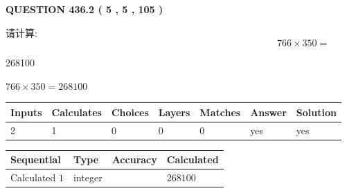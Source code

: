 \documentclass{ctexart}
\begin{document}
   
  
\vspace{0.2in}
  
{\textbf{\Large{QUESTION
436.2 
 ( 5 , 5 , 105 )
}}}
  
  
 
请计算:
\begin{equation}
766  \times    %
350 = \nonumber
\end{equation}
 
 
 
\noindent{}
 
 

268100
 
 
\noindent{}
 
 

 
 
 
\noindent{}
 
 

$ %
766 \times  %
350=   %
268100$
 
 
\noindent{}
 
 

 
   
   
   
   
\noindent\begin{tabular}{|l|l|l|l|l|l|l|}
 \hline
Inputs & Calculates & Choices & Layers & Matches & Answer & Solution \\ \hline
 2  & 
 1  & 
 0
  & 
 0  & 
 0  & 
  yes & 
  yes 
  \\ \hline
 \end{tabular}
   
   
   
   
\noindent{}
   
   
  
  
\noindent\begin{tabular}{|l|l|l|l|}
\hline
 Sequential & Type & Accuracy & Calculated \\ 
\hline
 
 
  Calculated $  1 $ & integer &  & 
  $ 268100 $ 
 \\  \hline  
 \end{tabular}
   
\end{document}

